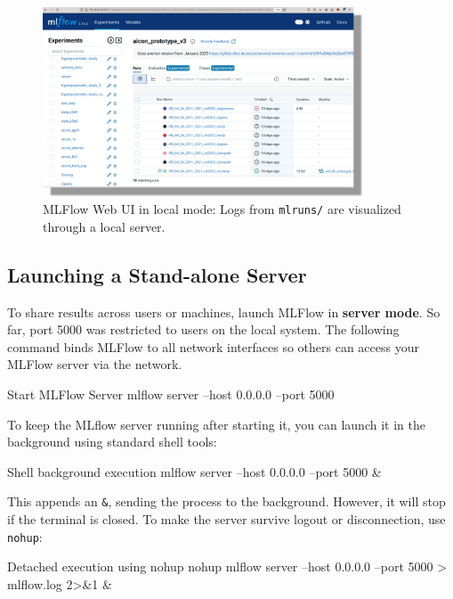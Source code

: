 \begin{figure}[htbp]
    \centering
    \includegraphics[width=0.85\textwidth]{images/mlflow_ui_local.png}
    \caption{MLFlow Web UI in local mode: Logs from \texttt{mlruns/} are visualized through a local server.}
    \label{fig:mlflow_local_ui}
\end{figure}

\subsection{Launching a Stand-alone Server}

To share results across users or machines, launch MLFlow in \textbf{server mode}.
So far, port 5000 was restricted to users on the local system.
The following command binds MLFlow to all network interfaces so others can access your MLFlow server via the network.

\begin{codeonly}{Start MLFlow Server}
	mlflow server --host 0.0.0.0 --port 5000
\end{codeonly}

To keep the MLflow server running after starting it, you can launch it in the background using standard shell tools:

\begin{codeonly}{Shell background execution}
	mlflow server --host 0.0.0.0 --port 5000 &
\end{codeonly}

This appends an \texttt{\&}, sending the process to the background. However, it will stop if the terminal is closed. To make the server survive logout or disconnection, use \texttt{nohup}:

\begin{codeonly}{Detached execution using nohup}
	nohup mlflow server --host 0.0.0.0 --port 5000 > mlflow.log 2>&1 &
\end{codeonly}

